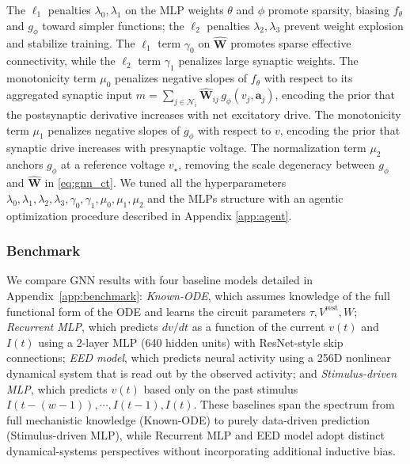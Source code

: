 \documentclass{article}
\def\stimbase{Stimulus-driven MLP}
\def\eedbase{EED model}
\def\mlpbase{Recurrent MLP}
\def\vrest{V^{\mathrm{rest}}}
\begin{document}
The $\ell_1$ penalties $\lambda_0,\lambda_1$ on the MLP weights $\theta$ and $\phi$ promote sparsity, biasing $f_\theta$ and $g_\phi$ toward simpler functions; the $\ell_2$ penalties $\lambda_2,\lambda_3$ prevent weight explosion and stabilize training. The $\ell_1$ term $\gamma_0$ on $\hat{\mathbf{W}}$ promotes sparse effective connectivity, while the $\ell_2$ term $\gamma_1$ penalizes large synaptic weights. The monotonicity term $\mu_0$ penalizes negative slopes of $f_\theta$ with respect to its aggregated synaptic input $m=\sum_{j\in\mathcal{N}_i}\hat{\mathbf{W}}_{ij}\,g_\phi(v_j,\mathbf{a}_j)$, encoding the prior that the postsynaptic derivative increases with net excitatory drive. The monotonicity term $\mu_1$ penalizes negative slopes of $g_\phi$ with respect to $v$, encoding the prior that synaptic drive increases with presynaptic voltage. The normalization term $\mu_2$ anchors $g_\phi$ at a reference voltage $v_\star$, removing the scale degeneracy between $g_\phi$ and $\hat{\mathbf{W}}$ in \cref{eq:gnn_ct}. We tuned all the hyperparameters $\lambda_0,\lambda_1,\lambda_2,\lambda_3,\gamma_0,\gamma_1,\mu_0,\mu_1,\mu_2$ and the MLPs structure with an agentic optimization procedure described in Appendix \ref{app:agent}.


\subsubsection*{Benchmark}
We compare GNN results with four baseline models detailed in Appendix~\ref{app:benchmark}: \emph{Known-ODE}, which assumes knowledge of the full functional form of the ODE and learns the circuit parameters $\tau, \vrest, W$; \emph{\mlpbase}, which predicts $dv/dt$ as a function of the current $v(t)$ and $I(t)$ using a 2-layer MLP (640 hidden units) with ResNet-style skip connections; \emph{\eedbase}, which predicts neural activity using a 256D nonlinear dynamical system that is read out by the observed activity; and \emph{Stimulus-driven MLP}, which predicts $v(t)$ based only on the past stimulus $I(t-(w-1)), \cdots, I(t-1), I(t)$. These baselines span the spectrum from full mechanistic knowledge (Known-ODE) to purely data-driven prediction (\stimbase), while \mlpbase{ }and \eedbase{ }adopt distinct dynamical-systems perspectives without incorporating additional inductive bias.

\end{document}
